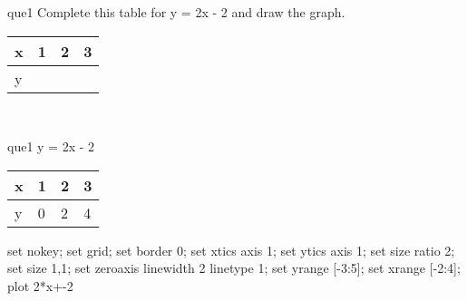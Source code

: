 \documentclass[13.5pt, varwidth=true]{beamer}
\begin{document}
\begin{frame}[shrink=19,fragile]
	\begin{beamercolorbox}[rounded=true, left, shadow=true,wd=14.8cm]{que1}
		 Complete this table for y = 2x - 2 and draw the graph. \\[0.3cm] \renewcommand{\arraystretch}{1.2}\begin{tabular}{|C|C|C|C|} \hline x & 1 & 2 & 3 \\ \hline y & & & \\ \hline \end{tabular}\\[0.3cm]
	\end{beamercolorbox}
\end{frame}
\begin{frame}[shrink=19,fragile]
	\begin{beamercolorbox}[rounded=true, left, shadow=true,wd=14.8cm]{que1}
		y = 2x - 2\renewcommand{\arraystretch}{1.2}\begin{tabular}{|C|C|C|C|} \hline x & 1 & 2 & 3 \\ \hline y & 0 & 2 & 4\\ \hline \end{tabular}\begin{gnuplot}[terminal=pdf] set nokey; set grid; set border 0; set xtics axis 1; set ytics axis 1; set size ratio 2; set size 1,1; set zeroaxis linewidth 2 linetype 1; set yrange [-3:5]; set xrange [-2:4]; plot 2*x+-2 \end{gnuplot}
	\end{beamercolorbox}
\end{frame}
\end{document}
